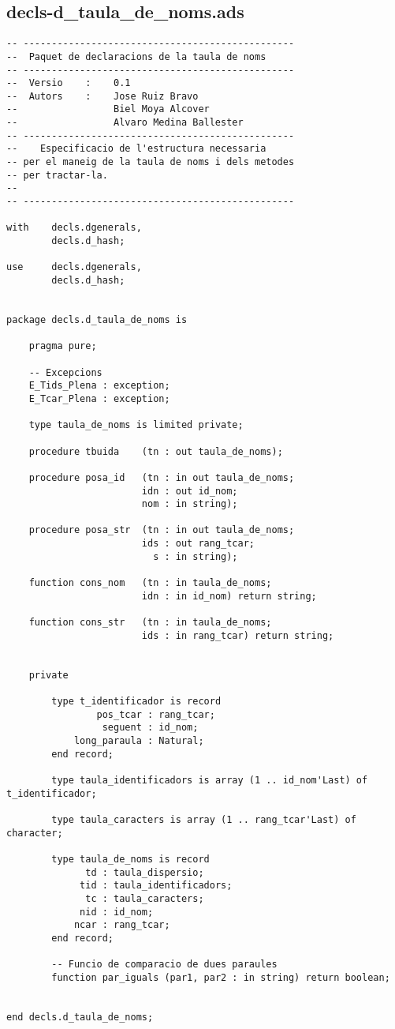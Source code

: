 \documentclass[10pt]{report}
\begin{document}
    \subsection{decls-d\_taula\_de\_noms.ads}
    \begin{lstlisting}[style=Ada]
-- ------------------------------------------------
--  Paquet de declaracions de la taula de noms
-- ------------------------------------------------
--  Versio    :    0.1
--  Autors    :    Jose Ruiz Bravo
--                 Biel Moya Alcover
--                 Alvaro Medina Ballester
-- ------------------------------------------------
--    Especificacio de l'estructura necessaria
-- per el maneig de la taula de noms i dels metodes
-- per tractar-la.
--
-- ------------------------------------------------

with    decls.dgenerals,
        decls.d_hash; 
        
use     decls.dgenerals,
        decls.d_hash;


package decls.d_taula_de_noms is

    pragma pure;
    
    -- Excepcions
    E_Tids_Plena : exception;
    E_Tcar_Plena : exception;
    
    type taula_de_noms is limited private;
    
    procedure tbuida    (tn : out taula_de_noms);
    
    procedure posa_id   (tn : in out taula_de_noms;  
                        idn : out id_nom; 
                        nom : in string);
    
    procedure posa_str  (tn : in out taula_de_noms;
                        ids : out rang_tcar;
                          s : in string);
                        
    function cons_nom   (tn : in taula_de_noms; 
                        idn : in id_nom) return string;
    
    function cons_str   (tn : in taula_de_noms; 
                        ids : in rang_tcar) return string;
                                
    
    private
        
        type t_identificador is record 
                pos_tcar : rang_tcar;
                 seguent : id_nom;
            long_paraula : Natural;
        end record;
        
        type taula_identificadors is array (1 .. id_nom'Last) of t_identificador;
        
        type taula_caracters is array (1 .. rang_tcar'Last) of character;
        
        type taula_de_noms is record
              td : taula_dispersio;
             tid : taula_identificadors;
              tc : taula_caracters;
             nid : id_nom;
            ncar : rang_tcar;
        end record;
        
        -- Funcio de comparacio de dues paraules
        function par_iguals (par1, par2 : in string) return boolean;        
                    
            
end decls.d_taula_de_noms;         
    \end{lstlisting}
    
\end{document}
